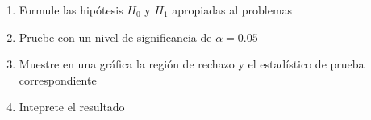 \documentclass[addpoints]{exam}
\theoremstyle{mytheor}
\begin{document}
\begin{questions}
\begin{enumerate}
\item Formule las hipótesis $H_0$ y $H_1$ apropiadas al problemas
\item Pruebe con un nivel de significancia de $\alpha = 0.05$
\item Muestre en una gráfica la región de rechazo y el estadístico de prueba correspondiente
\item Inteprete el resultado
\end{enumerate}


\end{questions}
\end{document}
